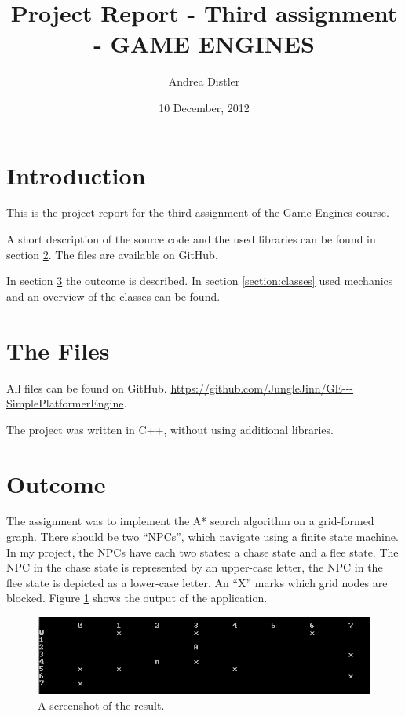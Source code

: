 \documentclass[12pt]{article}
\title{Project Report - Third assignment - GAME ENGINES}
\author{Andrea Distler}
\date{10 December, 2012}
\begin{document}
\maketitle
\newpage

\tableofcontents
\newpage

\section{Introduction}
This is the project report for the third assignment of the Game Engines course.

A short description of the source code and the used libraries can be found in section \ref{section:files}. The files are available on GitHub.

In section \ref{section:outcome} the outcome is described. In section \ref{section:classes} used mechanics and an overview of the classes can be found.

\section{The Files}
\label{section:files}
All files can be found on GitHub. \newline 
\url{https://github.com/JungleJinn/GE---SimplePlatformerEngine}.

The project was written in C++, without using additional libraries.

\section{Outcome}
\label{section:outcome}

The assignment was to implement the A* search algorithm on a grid-formed graph. There should be two ``NPCs'', which navigate using a finite state machine. In my project, the NPCs have each two states: a chase state and a flee state. The NPC in the chase state is represented by an upper-case letter, the NPC in the flee state is depicted as a lower-case letter. An ``X'' marks which grid nodes are blocked. Figure \ref{figure:outcome} shows the output of the application.

\begin{figure}[H]
	\includegraphics[width=\textwidth]{screenshot.png}
	\caption{A screenshot of the result.}
	\label{figure:outcome}
\end{figure}
\end{document}
